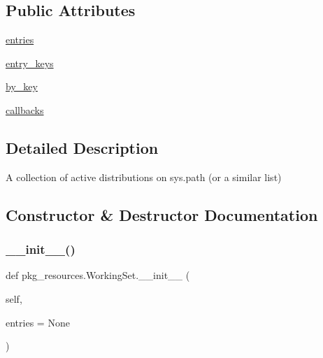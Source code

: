 \subsection*{Public Attributes}
\begin{DoxyCompactItemize}
\item 
\hyperlink{classpkg__resources_1_1WorkingSet_aa9a6eb37900163d92183a1e40a0b52f4}{entries}
\item 
\hyperlink{classpkg__resources_1_1WorkingSet_afe054ebd8bc27fe61aa90cecadaa9bad}{entry\+\_\+keys}
\item 
\hyperlink{classpkg__resources_1_1WorkingSet_ac0e359dc968ec95eb2b5aed2988daa36}{by\+\_\+key}
\item 
\hyperlink{classpkg__resources_1_1WorkingSet_a5b68079da017460c2ad13d6514ae55d7}{callbacks}
\end{DoxyCompactItemize}


\subsection{Detailed Description}
\begin{DoxyVerb}A collection of active distributions on sys.path (or a similar list)\end{DoxyVerb}
 

\subsection{Constructor \& Destructor Documentation}
\mbox{\label{classpkg__resources_1_1WorkingSet_a88df1aa3c1781fcb4576a56854bab8da}} 
\subsubsection{\texorpdfstring{\+\_\+\+\_\+init\+\_\+\+\_\+()}{\_\_init\_\_()}}
{\footnotesize\ttfamily def pkg\+\_\+resources.\+Working\+Set.\+\_\+\+\_\+init\+\_\+\+\_\+ (\begin{DoxyParamCaption}\item[{}]{self,  }\item[{}]{entries = {\ttfamily None} }\end{DoxyParamCaption})}

